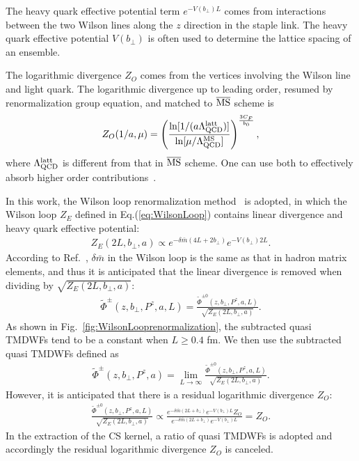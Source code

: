 The heavy quark effective potential term $e^{-V(b_{\perp})L}$ comes from interactions between the two Wilson lines along the $z$ direction in the staple link. The heavy quark effective potential $V(b_{\perp})$ is often used to determine the lattice spacing of an ensemble.  

The logarithmic divergence $Z_{O}$ comes from the vertices
involving the Wilson line and light quark. The logarithmic  divergence up to leading order, resumed by renormalization group equation, and matched to  $\overline{\rm MS}$ scheme is~\cite{Ji:1991pr, LatticePartonCollaborationLPC:2021xdx} 
\begin{align}\label{eq:ZO_RS_higher}
Z_{O}(1/a, \mu)=\left(\frac{\ln [1 /(a \Lambda_{\rm QCD}^{\rm latt})]}{\ln [\mu / \Lambda_{\rm QCD}^{\rm MS}]}\right)^{\frac{3 C_{F}}{b_0}},\nonumber\\
\end{align}
where $\Lambda_{\rm QCD}^{\rm latt}$  is different from that in $\overline{\rm MS}$ scheme. One can use both to effectively absorb higher order contributions~\cite{Lepage:1992xa}.

In this work,  the Wilson loop renormalization method~\cite{Chen:2016fxx,Zhang:2017bzy,Musch:2010ka,Green:2017xeu,Zhang:2017zfe}  is adopted, in which the Wilson loop $Z_E$ defined in Eq.(\ref{eq:WilsonLoop})  contains linear divergence and heavy quark effective potential:
\begin{align}
Z_E\left(2L, b_{\perp}, a\right) \propto e^{-\delta \bar{m}(4L+2b_{\perp})}e^{-V(b_{\perp})2L}.
\end{align}
According to Ref.~\cite{LatticePartonCollaborationLPC:2021xdx}, $\delta \bar{m}$ in the Wilson loop is the same as that in hadron matrix elements, and thus it is anticipated that the linear divergence is removed when dividing by $\sqrt{Z_E\left(2L, b_{\perp}, a\right)}$:
\begin{align}
\tilde{\Phi}^{\pm}(z,b_{\perp},P^z,a,L)=\frac{\tilde{\Phi}^{\pm0}\left(z,b_{\perp},P^z,a,L\right)}{\sqrt{Z_E\left(2L, b_{\perp}, a\right)}}.
\end{align}
As shown in Fig.~\ref{fig:WilsonLooprenormalization}, the subtracted quasi TMDWFs tend  to  be a constant when  $L\ge 0.4$ fm. We then use the subtracted quasi TMDWFs defined as
\begin{align}\label{eq:WLRQuasi}
\tilde{\Phi}^{\pm}(z,b_{\perp},P^z, a)=\lim_{L\to\infty}\frac{\tilde{\Phi}^{\pm0}\left(z,b_{\perp},P^z,a,L\right)}{\sqrt{Z_E\left(2L, b_{\perp}, a\right)}}.
\end{align}
However, it is anticipated that there is a residual logarithmic divergence $Z_{O}$:
\begin{align}
\frac{\tilde{\Phi}^{\pm0}\left(z,b_{\perp},P^z,a,L\right)}{\sqrt{Z_E\left(2L, b_{\perp}, a\right)}}
\propto \frac{e^{-\delta \bar{m}(2L+b_{\perp})}e^{-V(b_{\perp})L}Z_{O}}{e^{-\delta \bar{m}(2L+b_{\perp})}e^{-V(b_{\perp})L}}
= Z_{O}.
\end{align}
In the extraction of the CS kernel, a ratio of quasi TMDWFs is adopted and accordingly the residual logarithmic divergence $Z_{O}$ is canceled.



